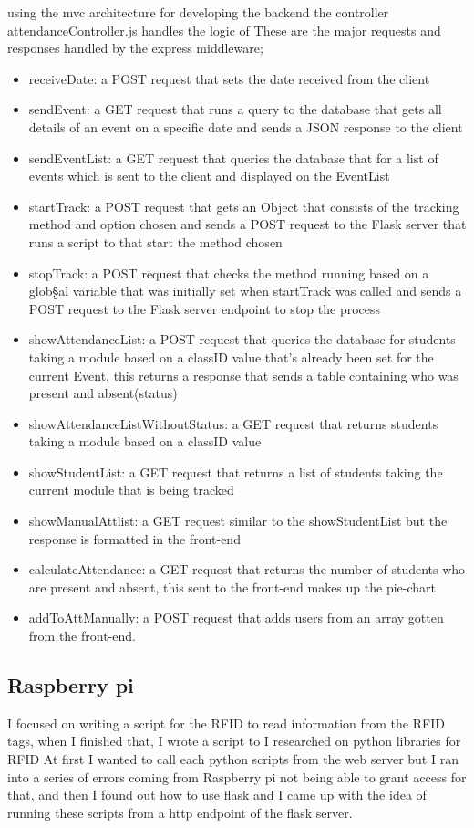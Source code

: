 using the mvc architecture for developing the backend the controller attendanceController.js handles the logic of
These are the major requests and responses handled by the express middleware;
\begin{itemize}
    \item receiveDate: a POST request that sets the date received from the client
    \item sendEvent: a GET request that runs a query to the database that gets all details of an event on a specific date and sends a \gls{JSON} response to the client
    \item sendEventList: a GET request that queries the database that for a list of events which is sent to the client and displayed on the EventList
    \item startTrack: a POST request that gets an Object that consists of the tracking method and option chosen and sends a POST request to the Flask server that runs a script to that start the method chosen
    \item stopTrack: a POST request that checks the method running based on a glob§al variable that was initially set when startTrack was called and sends a POST request to the Flask server endpoint to stop the process
    \item showAttendanceList: a POST request that queries the database for students taking a module based on a classID value that's already been set for the current Event, this returns a response that sends a table containing who was present and absent(status)
    \item showAttendanceListWithoutStatus: a GET request that returns students taking a module based on a classID value
    \item showStudentList: a GET request that returns a list of students taking the current module that is being tracked
    \item showManualAttlist: a GET request similar to the showStudentList but the response is formatted in the front-end
    \item calculateAttendance: a GET request that returns the number of students who are present and absent, this sent to the front-end makes up the pie-chart
    \item addToAttManually: a POST request that adds users from an array gotten from the front-end.
\end{itemize}



\subsection{Raspberry pi}
I focused on writing a script for the RFID to read information from the RFID tags, when I finished that, I wrote a script to 
I researched on python libraries for RFID
At first I wanted to call each python scripts from the web server but I ran into a series of errors coming from Raspberry pi not being able to grant access for that, and then I found out how to use flask and I came up with the idea of running these scripts from a http endpoint of the flask server.
